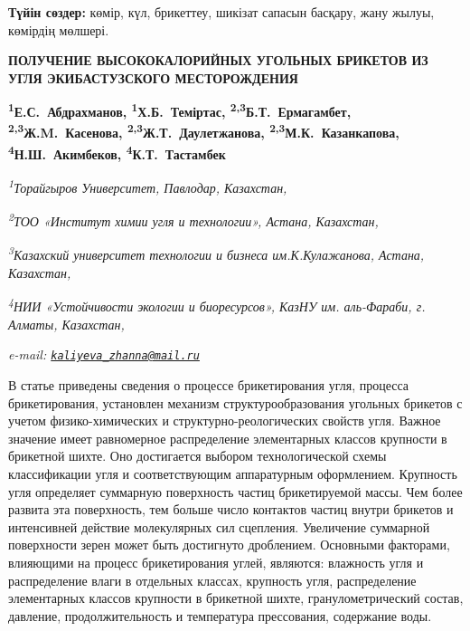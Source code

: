 {\bfseries Түйін сөздер:} көмір, күл, брикеттеу, шикізат сапасын басқару,
жану жылуы, көмірдің мөлшері.

\begin{articleheader}
{\bfseries ПОЛУЧЕНИЕ ВЫСОКОКАЛОРИЙНЫХ УГОЛЬНЫХ БРИКЕТОВ ИЗ УГЛЯ ЭКИБАСТУЗСКОГО МЕСТОРОЖДЕНИЯ}

{\bfseries
\textsuperscript{1}Е.С.~Абдрахманов,
\textsuperscript{1}Х.Б.~Теміртас,
\textsuperscript{2,3}Б.Т.~Ермагамбет,
\textsuperscript{2,3}Ж.M.~Касенова,
\textsuperscript{2,3}Ж.Т.~Даулетжанова\textsuperscript{\envelope },
\textsuperscript{2,3}М.К.~Казанкапова,
\textsuperscript{4}Н.Ш.~Акимбеков,
\textsuperscript{4}К.Т.~Тастамбек}
\end{articleheader}

\begin{affiliation}
\emph{\textsuperscript{1}Торайгыров Университет, Павлодар, Казахстан,}

\emph{\textsuperscript{2}ТОО «Институт химии угля и технологии», Астана, Казахстан,}

\emph{\textsuperscript{3}Казахский университет технологии и бизнеса им.К.Кулажанова, Астана, Казахстан,}

\emph{\textsuperscript{4}НИИ «Устойчивости экологии и биоресурсов», КазНУ им. аль-Фараби, г. Алматы, Казахстан,}

\emph{e-mail: \href{mailto:kaliyeva_zhanna@mail.ru}{\nolinkurl{kaliyeva\_zhanna@mail.ru}}}
\end{affiliation}

В статье приведены сведения о процессе брикетирования угля, процесса
брикетирования, установлен механизм структурообразования угольных
брикетов с учетом физико-химических и структурно-реологических свойств
угля. Важное значение имеет равномерное распределение элементарных
классов крупности в брикетной шихте. Оно достигается выбором
технологической схемы классификации угля и соответствующим аппаратурным
оформлением. Крупность угля определяет суммарную поверхность частиц
брикетируемой массы. Чем более развита эта поверхность, тем больше число
контактов частиц внутри брикетов и интенсивней действие молекулярных сил
сцепления. Увеличение суммарной поверхности зерен может быть достигнуто
дроблением. Основными факторами, влияющими на процесс брикетирования
углей, являются: влажность угля и распределение влаги в отдельных
классах, крупность угля, распределение элементарных классов крупности в
брикетной шихте, гранулометрический состав, давление, продолжительность
и температура прессования, содержание воды.

